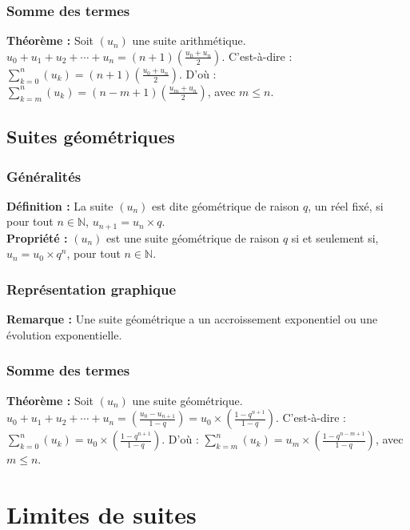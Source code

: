 \documentclass[a4paper,titlepage]{article}
\let\oldsection\section
\renewcommand\section{\clearpage\oldsection}
\begin{document}
        \subsubsection{Somme des termes}
            \textbf{Théorème :} Soit $\left(u_{n}\right)$ une suite arithmétique. $u_{0}+u_{1}+u_{2}+\cdots+u_{n}=\left(n+1\right)\left(\frac{u_{0}+u_{n}}{2}\right)$. C’est-à-dire : $\sum\limits_{k=0}^{n}\left(u_{k}\right)=\left(n+1\right)\left(\frac{u_{0}+u_{n}}{2}\right)$. D’où : $\sum\limits_{k=m}^{n}\left(u_{k}\right)=\left(n-m+1\right)\left(\frac{u_{m}+u_{n}}{2}\right)$, avec $m\leqslant n$.
    \subsection{Suites géométriques}
        \subsubsection{Généralités}
            \textbf{Définition :} La suite $\left(u_{n}\right)$ est dite géométrique de raison $q$, un réel fixé, si pour tout $n\in\mathbb{N}$, $u_{n+1}=u_{n}\times q$.
            \\
            \textbf{Propriété :} $\left(u_{n}\right)$ est une suite géométrique de raison $q$ si et seulement si, $u_{n}=u_{0}\times q^{n}$, pour tout $n\in\mathbb{N}$.
        \subsubsection{Représentation graphique}
            \textbf{Remarque :} Une suite géométrique a un accroissement exponentiel ou une évolution exponentielle.
        \subsubsection{Somme des termes}
            \textbf{Théorème :} Soit $\left(u_{n}\right)$ une suite géométrique. $u_{0}+u_{1}+u_{2}+\cdots+u_{n}=\left(\frac{u_{0}-u_{n+1}}{1-q}\right)=u_{0}\times\left(\frac{1-q^{n+1}}{1-q}\right)$. C’est-à-dire : $\sum\limits_{k=0}^{n}\left(u_{k}\right)=u_{0}\times\left(\frac{1-q^{n+1}}{1-q}\right)$. D’où : $\sum\limits_{k=m}^{n}\left(u_{k}\right)=u_{m}\times\left(\frac{1-q^{n-m+1}}{1-q}\right)$, avec $m\leqslant n$.
\section{Limites de suites}
\end{document}
